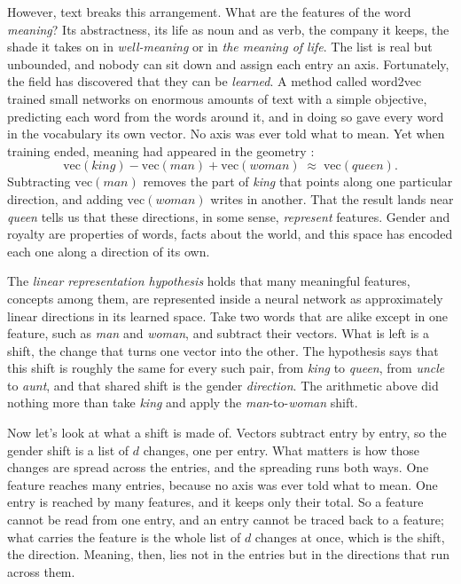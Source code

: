 \documentclass[11pt]{article}
\begin{document}
However, text breaks this arrangement. What are the features of the word \textit{meaning}? Its abstractness, its life as noun and as verb, the company it keeps, the shade it takes on in \textit{well-meaning} or in \textit{the meaning of life}. The list is real but unbounded, and nobody can sit down and assign each entry an axis. Fortunately, the field has discovered that they can be \emph{learned}. A method called word2vec \citep{mikolov2013efficient} trained small networks on enormous amounts of text with a simple objective, predicting each word from the words around it, and in doing so gave every word in the vocabulary its own vector. No axis was ever told what to mean. Yet when training ended, meaning had appeared in the geometry \citep{mikolov2013linguistic}:
\[
\mathrm{vec}(\textit{king}) - \mathrm{vec}(\textit{man}) + \mathrm{vec}(\textit{woman}) \;\approx\; \mathrm{vec}(\textit{queen}).
\]
Subtracting $\mathrm{vec}(\textit{man})$ removes the part of \textit{king} that points along one particular direction, and adding $\mathrm{vec}(\textit{woman})$ writes in another. That the result lands near \textit{queen} tells us that these directions, in some sense, \emph{represent} features. Gender and royalty are properties of words, facts about the world, and this space has encoded each one along a direction of its own.

The \emph{linear representation hypothesis} holds that many meaningful features, concepts among them, are represented inside a neural network as approximately linear directions in its learned space. Take two words that are alike except in one feature, such as \textit{man} and \textit{woman}, and subtract their vectors. What is left is a shift, the change that turns one vector into the other. The hypothesis says that this shift is roughly the same for every such pair, from \textit{king} to \textit{queen}, from \textit{uncle} to \textit{aunt}, and that shared shift is the gender \emph{direction}. The arithmetic above did nothing more than take \textit{king} and apply the \textit{man}-to-\textit{woman} shift.

Now let's look at what a shift is made of. Vectors subtract entry by entry, so the gender shift is a list of $d$ changes, one per entry. What matters is how those changes are spread across the entries, and the spreading runs both ways. One feature reaches many entries, because no axis was ever told what to mean. One entry is reached by many features, and it keeps only their total. So a feature cannot be read from one entry, and an entry cannot be traced back to a feature; what carries the feature is the whole list of $d$ changes at once, which is the shift, the direction. Meaning, then, lies not in the entries but in the directions that run across them.
\end{document}
